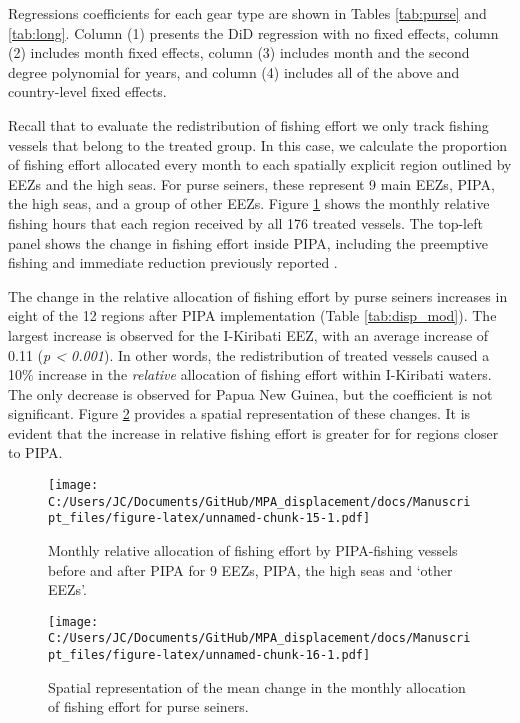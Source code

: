 \documentclass[11pt,]{article}
\begin{document}
Regressions coefficients for each gear type are shown in Tables
\ref{tab:purse} and \ref{tab:long}. Column (1) presents the DiD
regression with no fixed effects, column (2) includes month fixed
effects, column (3) includes month and the second degree polynomial for
years, and column (4) includes all of the above and country-level fixed
effects.

Recall that to evaluate the redistribution of fishing effort we only
track fishing vessels that belong to the treated group. In this case, we
calculate the proportion of fishing effort allocated every month to each
spatially explicit region outlined by EEZs and the high seas. For purse
seiners, these represent 9 main EEZs, PIPA, the high seas, and a group
of other EEZs. Figure \ref{fig:redist_trend_ps} shows the monthly
relative fishing hours that each region received by all 176 treated
vessels. The top-left panel shows the change in fishing effort inside
PIPA, including the preemptive fishing and immediate reduction
previously reported \citep{mcdermott_2018}.

The change in the relative allocation of fishing effort by purse seiners
increases in eight of the 12 regions after PIPA implementation (Table
\ref{tab:disp_mod}). The largest increase is observed for the I-Kiribati
EEZ, with an average increase of 0.11 (\emph{p \textless{} 0.001}). In
other words, the redistribution of treated vessels caused a 10\%
increase in the \emph{relative} allocation of fishing effort within
I-Kiribati waters. The only decrease is observed for Papua New Guinea,
but the coefficient is not significant. Figure \ref{fig:map_change_ps}
provides a spatial representation of these changes. It is evident that
the increase in relative fishing effort is greater for for regions
closer to PIPA.

\begin{figure}
\centering
\texttt{[image: C:/Users/JC/Documents/GitHub/MPA\_displacement/docs/Manuscript\_files/figure-latex/unnamed-chunk-15-1.pdf]}
\caption{\label{fig:unnamed-chunk-15}\label{fig:redist_trend_ps}Monthly
relative allocation of fishing effort by PIPA-fishing vessels before and
after PIPA for 9 EEZs, PIPA, the high seas and `other EEZs'.}
\end{figure}

\begin{figure}
\centering
\texttt{[image: C:/Users/JC/Documents/GitHub/MPA\_displacement/docs/Manuscript\_files/figure-latex/unnamed-chunk-16-1.pdf]}
\caption{\label{fig:unnamed-chunk-16}\label{fig:map_change_ps}Spatial
representation of the mean change in the monthly allocation of fishing
effort for purse seiners.}
\end{figure}
\end{document}
